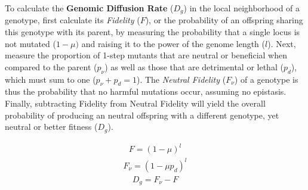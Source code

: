 \documentclass[PhD]{msu-thesis}
\begin{document}
To calculate the \textbf{Genomic Diffusion Rate} ($D_g$) in the local neighborhood of a genotype, first calculate its \textit{Fidelity} ($F$), or the probability of an offspring sharing this genotype with its parent, by measuring the probability that a single locus is not mutated ($1-\mu)$ and raising it to the power of the genome length ($l$). Next, measure the proportion of 1-step mutants that are neutral or beneficial when compared to the parent ($p_\nu$) as well as those that are detrimental or lethal ($p_d$), which must sum to one ($p_\nu + p_d = 1$).  The \textit{Neutral Fidelity} ($F_\nu$) of a genotype is thus the probability that no harmful mutations occur, assuming no epistasis. Finally, subtracting Fidelity from Neutral Fidelity will yield the overall probability of producing an neutral offspring with a different genotype, yet neutral or better fitness ($D_g$).

\begin{eqnarray}
\label{eq:fidelity}
	F = (1 - \mu)^l
\end{eqnarray}
\begin{eqnarray}
\label{eq:neutral_fidelity}
	F_\nu = (1 - \mu p_d)^l
\end{eqnarray}
\begin{eqnarray}
\label{eq:genomic_diffusion_rate}
	D_g = F_\nu - F
\end{eqnarray}



\end{document}

